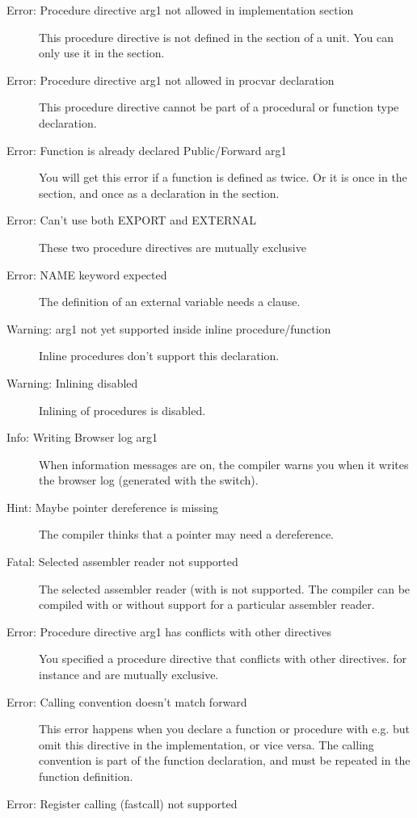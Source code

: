 \begin{description}
\item [Error: Procedure directive arg1 not allowed in implementation section]
 This procedure directive is not defined in the  section of
 a unit. You can only use it in the  section.
\item [Error: Procedure directive arg1 not allowed in procvar declaration]
 This procedure directive cannot be part of a procedural or function
 type declaration.
\item [Error: Function is already declared Public/Forward arg1]
 You will get this error if a function is defined as  twice.
 Or it is once in the  section, and once as a 
 declaration in the  section.
\item [Error: Can't use both EXPORT and EXTERNAL]
 These two procedure directives are mutually exclusive
\item [Error: NAME keyword expected]
 The definition of an external variable needs a  clause.
\item [Warning: arg1 not yet supported inside inline procedure/function]
 Inline procedures don't support this declaration.
\item [Warning: Inlining disabled]
 Inlining of procedures is disabled.
\item [Info: Writing Browser log arg1]
 When information messages are on, the compiler warns you when it
 writes the browser log (generated with the  switch).
\item [Hint: Maybe pointer dereference is missing]
 The compiler thinks that a pointer may need a dereference.
\item [Fatal: Selected assembler reader not supported]
 The selected assembler reader (with  is not
 supported. The compiler can be compiled with or without support for a
 particular assembler reader.
\item [Error: Procedure directive arg1 has conflicts with other directives]
 You specified a procedure directive that conflicts with other directives.
 for instance  and  are mutually exclusive.
\item [Error: Calling convention doesn't match forward]
 This error happens when you declare a function or procedure with
 e.g.  but omit this directive in the implementation, or vice
 versa. The calling convention is part of the function declaration, and
 must be repeated in the function definition.
\item [Error: Register calling (fastcall) not supported]

\end{description}
